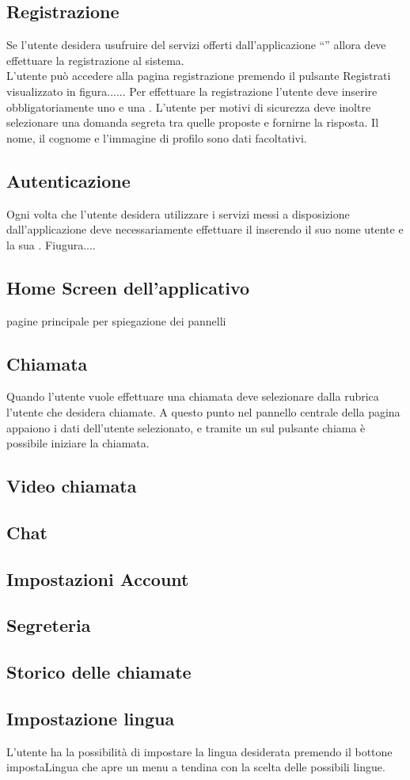 \subsection{Registrazione}
Se l'utente desidera usufruire del servizi offerti dall'applicazione ``\caName'' allora deve effettuare la registrazione al sistema.\\
L'utente può accedere alla pagina registrazione premendo il pulsante Registrati visualizzato in figura......
Per effettuare la registrazione l'utente deve inserire obbligatoriamente uno  e una .
L'utente per motivi di sicurezza deve inoltre selezionare una domanda segreta tra quelle proposte e fornirne la risposta.
Il nome, il cognome e l'immagine di profilo sono dati facoltativi.

\subsection{Autenticazione}
Ogni volta che l'utente desidera utilizzare i servizi messi a disposizione dall'applicazione deve necessariamente effettuare il  inserendo il suo nome utente e la sua .
Fiugura....

\subsection{Home Screen dell'applicativo }
pagine principale per spiegazione dei pannelli


\subsection{Chiamata}
Quando l'utente vuole effettuare una chiamata deve selezionare dalla rubrica l'utente che desidera chiamate. A questo punto nel pannello centrale della pagina appaiono i dati dell'utente selezionato, e tramite un  sul pulsante chiama è possibile iniziare la chiamata.
\subsection{Video chiamata}
\subsection{Chat}
\subsection{Impostazioni Account}
\subsection{Segreteria}
\subsection{Storico delle chiamate}
\subsection{Impostazione lingua}
L'utente ha la possibilità di impostare la lingua desiderata premendo il bottone impostaLingua che apre un menu a tendina con la scelta delle possibili lingue.




